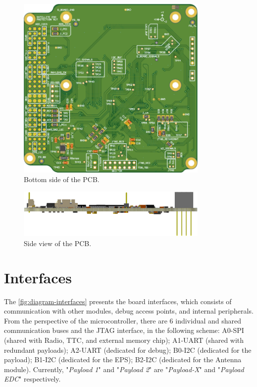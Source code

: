 \begin{figure}[!ht]
    \begin{center}
        \includegraphics[width=93mm]{figures/obdh2-pcb-bottom.png}
        \caption{Bottom side of the PCB.}
        \label{fig:pcb-bottom}
    \end{center}
\end{figure}

\begin{figure}[!ht]
    \begin{center}
        \includegraphics[width=93mm]{figures/obdh2-pcb-side.png}
        \caption{Side view of the PCB.}
        \label{fig:pcb-side}
    \end{center}
\end{figure}


\section{Interfaces}


The \autoref{fig:diagram-interfaces} presents the board interfaces, which consists of communication with other modules, debug access points, and internal peripherals. From the perspective of the microcontroller, there are 6 individual and shared communication buses and the JTAG interface, in the following scheme: A0-SPI (shared with Radio, TTC, and external memory chip); A1-UART (shared with redundant payloads); A2-UART (dedicated for debug); B0-I2C (dedicated for the payload); B1-I2C (dedicated for the EPS); B2-I2C (dedicated for the Antenna module). Currently, "\textit{Payload 1}" and "\textit{Payload 2}" are "\textit{Payload-X}" and "\textit{Payload EDC}" respectively.

